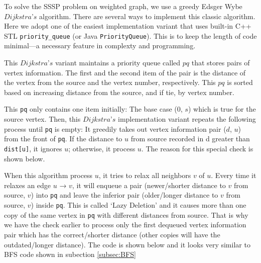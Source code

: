 \hspace{7mm}To solve the SSSP problem on weighted graph, we use a greedy Edsger Wybe $Dijkstra’s$ algorithm. There are several ways to implement this classic algorithm. Here we adopt one of the easiest implementation variant that uses built-in C++ STL \lstinline|priority_queue| (or Java \lstinline|PriorityQueue|). This is to keep the length of code minimal—a necessary feature in complexty and programming.

\hspace{7mm}This $Dijkstra’s$ variant maintains a priority queue called $pq$ that stores pairs of vertex
information. The first and the second item of the pair is the distance of the vertex from the
source and the vertex number, respectively. This $pq$ is sorted based on increasing distance
from the source, and if tie, by vertex number.

\hspace{7mm}This \lstinline|pq| only contains one item initially: The base case ($0$, $s$) which is true for the source
vertex. Then, this $Dijkstra’s$ implementation variant repeats the following process until \lstinline|pq|
is empty: It greedily takes out vertex information pair ($d$, $u$) from the front of \lstinline|pq|. If the
distance to $u$ from source recorded in d greater than \lstinline|dist[u]|, it ignores $u$; otherwise, it
process $u$. The reason for this special check is shown below.

\hspace{7mm}When this algorithm process $u$, it tries to relax \footnotemark 
{}
all neighbors $v$ of $u$. Every time it
relaxes an edge $u$ → $v$, it will enqueue a pair (newer/shorter distance to $v$ from source, $v$)
into \lstinline|pq| and leave the inferior pair (older/longer distance to $v$ from source, $v$) inside \lstinline|pq|. This
is called ‘Lazy Deletion’ and it causes more than one copy of the same vertex in \lstinline|pq| with
different distances from source. That is why we have the check earlier to process only the
first dequeued vertex information pair which has the correct/shorter distance (other copies
will have the outdated/longer distance). The code is shown below and it looks very similar
to BFS code shown in subection \ref{subsec:BFS}\newline\newline

